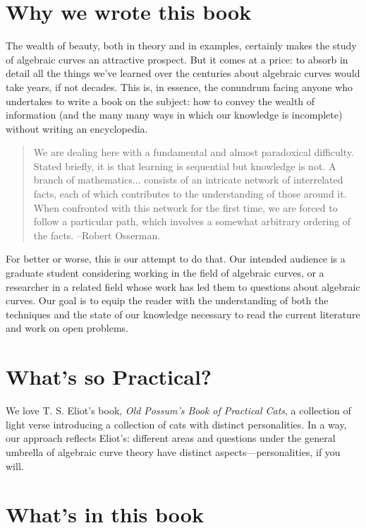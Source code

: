 \section{Why we wrote this book}

The wealth of beauty, both in theory and in examples, certainly makes the study of algebraic curves an attractive prospect. But it comes at a price: to absorb in detail all the things we've learned over the centuries about algebraic curves would take years, if not decades. This is, in essence, the conundrum facing anyone who undertakes to write a book on the subject: how to convey the wealth of information  (and the many many ways in which our knowledge is incomplete) without writing an encyclopedia.

\begin{quote}
\small\sf
We are dealing here with a fundamental and almost paradoxical difficulty. Stated briefly, it is that learning is sequential but knowledge is not. A branch of mathematics... consists of an intricate network  of interrelated facts, each of which contributes to the understanding of those around it. When confronted with this network for the first time, we are forced to follow a particular path, which involves a somewhat arbitrary ordering of the facts.
--Robert Osserman.
\end{quote}


For better or worse, this is our attempt to do  that. Our intended audience is a graduate student considering working in the field of algebraic curves, or a researcher in a related field whose work has led them to questions about algebraic curves. Our goal is to equip the reader with the understanding of both the techniques and the state of our knowledge necessary to read the current literature and work on open problems.

\section{What's so Practical?}

We love T. S. Eliot's book, \emph{Old Possum's Book of Practical Cats}, a collection of light verse introducing a collection of cats with distinct personalities. In a way, our approach reflects Eliot's: different areas and questions under the general umbrella of algebraic curve theory have distinct aspects---personalities, if you will.

\section{What's in this book}

